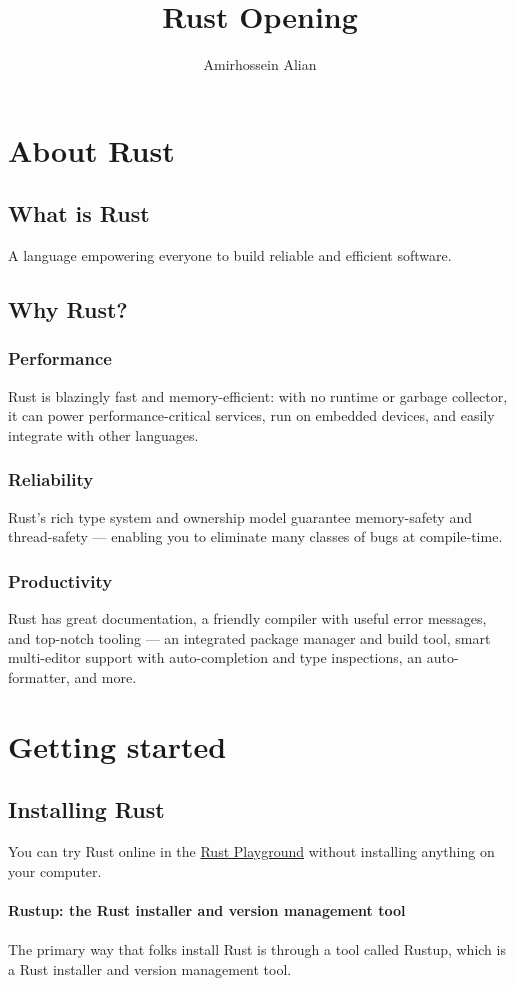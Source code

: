 \documentclass[12pt]{article}
\title{Rust Opening}
\author{Amirhossein Alian}
\begin{document}
    \maketitle
    
\section{About Rust}
\subsection{What is Rust}
A language empowering everyone
to build reliable and efficient software. 
\subsection{Why Rust?}
\subsubsection{Performance}
Rust is blazingly fast and memory-efficient: with no runtime or garbage collector, it can power performance-critical services, run on embedded devices, and easily integrate with other languages. 
\subsubsection{Reliability}
Rust’s rich type system and ownership model guarantee memory-safety and thread-safety — enabling you to eliminate many classes of bugs at compile-time. 
\subsubsection{Productivity}
Rust has great documentation, a friendly compiler with useful error messages, and top-notch tooling — an integrated package manager and build tool, smart multi-editor support with auto-completion and type inspections, an auto-formatter, and more.
\pagebreak
\section{Getting started}
\subsection{Installing Rust}
You can try Rust online in the \href{https://play.rust-lang.org/} {Rust Playground} without installing anything on your computer.
\\\\
\textbf{Rustup: the Rust installer and version management tool}
\\\\
The primary way that folks install Rust is through a tool called Rustup, which is a Rust installer and version management tool.
\end{document}
